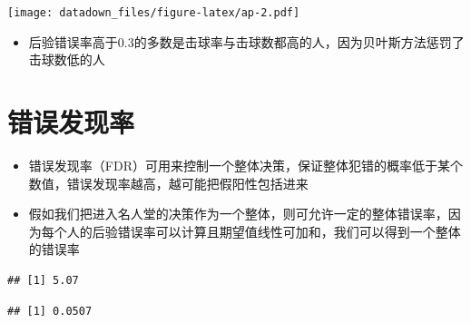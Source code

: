 \documentclass[]{book}
\newenvironment{Shaded}{\begin{snugshade}}{\end{snugshade}}
\newcommand{\CommentTok}[1]{\textcolor[rgb]{0.56,0.35,0.01}{\textit{#1}}}
\newcommand{\DecValTok}[1]{\textcolor[rgb]{0.00,0.00,0.81}{#1}}
\newcommand{\KeywordTok}[1]{\textcolor[rgb]{0.13,0.29,0.53}{\textbf{#1}}}
\newcommand{\NormalTok}[1]{#1}
\newcommand{\OperatorTok}[1]{\textcolor[rgb]{0.81,0.36,0.00}{\textbf{#1}}}
\newcommand{\StringTok}[1]{\textcolor[rgb]{0.31,0.60,0.02}{#1}}
\providecommand{\tightlist}{%
  \setlength{\itemsep}{0pt}\setlength{\parskip}{0pt}}
\begin{document}
\texttt{[image: datadown\_files/figure-latex/ap-2.pdf]}

\begin{itemize}
\tightlist
\item
  后验错误率高于0.3的多数是击球率与击球数都高的人，因为贝叶斯方法惩罚了击球数低的人
\end{itemize}

\section{错误发现率}

\begin{itemize}
\item
  错误发现率（FDR）可用来控制一个整体决策，保证整体犯错的概率低于某个数值，错误发现率越高，越可能把假阳性包括进来
\item
  假如我们把进入名人堂的决策作为一个整体，则可允许一定的整体错误率，因为每个人的后验错误率可以计算且期望值线性可加和，我们可以得到一个整体的错误率
\end{itemize}

\begin{Shaded}
\end{Shaded}

\begin{verbatim}
## [1] 5.07
\end{verbatim}

\begin{Shaded}
\end{Shaded}

\begin{verbatim}
## [1] 0.0507
\end{verbatim}

\begin{Shaded}
\end{Shaded}
\end{document}
